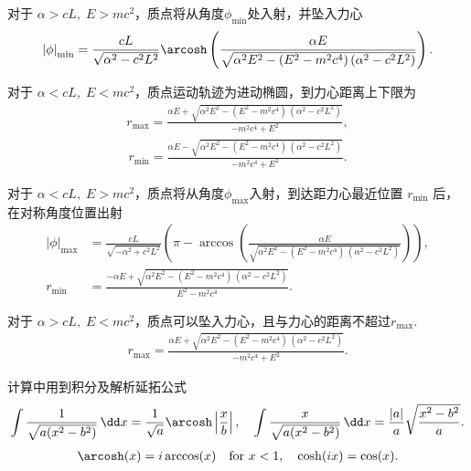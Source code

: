 对于 \(\alpha > cL,\; E > mc^2\)，质点将从角度\(\phi_{\min}\)处入射，并坠入力心
\begin{align*}
	\left| \phi \right|_{\min}
	=
	\frac{
		cL
	}{
		\sqrt{
			\alpha^2 - c^2 L^2
		}
	}
	\arcosh \left(
	\frac{
		\alpha E
	}{
		\sqrt{
			\alpha^2 E^2 - (E^2 - m^2 c^4)\,(\alpha^2 - c^2 L^2)
		}
	}
	\right).
\end{align*}

对于 \(\alpha < cL,\; E < mc^2\)，质点运动轨迹为进动椭圆，到力心距离上下限为
\begin{align*}
	r_{\max} =
	\frac{
		\alpha E +
		\sqrt{
			\alpha^2 E^2 - (E^2 - m^2 c^4)\,(\alpha^2 - c^2 L^2)
		}
	}{
		-m^2 c^4 + E^2
	},
\end{align*}
\begin{align*}
	r_{\min} =
	\frac{
		\alpha E -
		\sqrt{
			\alpha^2 E^2 - (E^2 - m^2 c^4)\,(\alpha^2 - c^2 L^2)
		}
	}{
		-m^2 c^4 + E^2
	}.
\end{align*}

对于 \(\alpha < cL,\; E > mc^2\)，质点将从角度\(\phi_{\max}\)入射，到达距力心最近位置 \(r_{\min}\) 后，在对称角度位置出射
\begin{align*}
	\left| \phi \right|_{\max}
	&=
	\frac{cL}{\sqrt{-\alpha^2 + c^2 L^2}}
	\left(
	\pi -
	\arccos \left(
		\frac{
			\alpha E
		}{
			\sqrt{
				\alpha^2 E^2 - (E^2 - m^2 c^4)\,(\alpha^2 - c^2 L^2)
			}
		}
		\right)
	\right),\\
	r_{\min} &=
	\frac{
		-\alpha E +
		\sqrt{
			\alpha^2 E^2 - (E^2 - m^2 c^4)\,(\alpha^2 - c^2 L^2)
		}
	}{
		E^2 - m^2 c^4
	}.
\end{align*}

对于 \(\alpha > cL,\; E < mc^2\)，质点可以坠入力心，且与力心的距离不超过\(r_{\max}\).
\begin{align*}
	r_{\max} =
	\frac{
		\alpha E +
		\sqrt{
			\alpha^2 E^2 - (E^2 - m^2 c^4)\,(\alpha^2 - c^2 L^2)
		}
	}{
		-m^2 c^4 + E^2
	}.
\end{align*}

计算中用到积分及解析延拓公式
\begin{align*}
	\int \dfrac{1}{\sqrt{a (x^2 - b^2)}} \, \dd x = \dfrac{1}{\sqrt{a}} \arcosh \left| \dfrac{x}{b} \right|,\quad   \int \dfrac{x}{\sqrt{a (x^2 - b^2)}} \, \dd x = \dfrac{|a|}{a} \sqrt{\dfrac{x^2 - b^2}{a}}.
\end{align*}
\begin{align*}
	\arcosh(x) = i \arccos(x)\quad \text{for}\,\, x < 1,\quad
	\cosh(i x) = \cos(x).
\end{align*}

